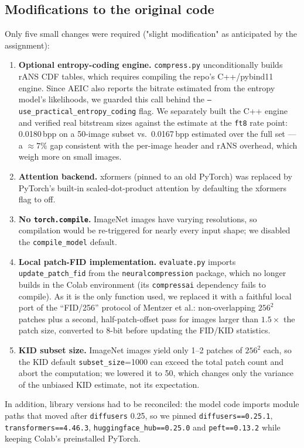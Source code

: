 \documentclass[conference]{IEEEtran}
\begin{document}
\subsection{Modifications to the original code}
Only five small changes were required ("slight modification" as anticipated by the assignment):
\begin{enumerate}
\item \textbf{Optional entropy-coding engine.} \texttt{compress.py} unconditionally builds rANS
CDF tables, which requires compiling the repo's C++/pybind11 engine. Since AEIC also reports the
bitrate estimated from the entropy model's likelihoods, we guarded this call behind the
\texttt{--use\_practical\_entropy\_coding} flag. We separately built the C++ engine and verified
real bitstream sizes against the estimate at the \texttt{ft8} rate point: 0.0180\,bpp on a
50-image subset vs.\ 0.0167\,bpp estimated over the full set --- a ${\approx}7\%$ gap consistent
with the per-image header and rANS overhead, which weigh more on small images.
\item \textbf{Attention backend.} xformers (pinned to an old PyTorch) was replaced by PyTorch's
built-in scaled-dot-product attention by defaulting the xformers flag to off.
\item \textbf{No \texttt{torch.compile}.} ImageNet images have varying resolutions, so
compilation would be re-triggered for nearly every input shape; we disabled the
\texttt{compile\_model} default.
\item \textbf{Local patch-FID implementation.} \texttt{evaluate.py} imports
\texttt{update\_patch\_fid} from the \texttt{neuralcompression} package, which no longer builds
in the Colab environment (its \texttt{compressai} dependency fails to compile). As it is the only
function used, we replaced it with a faithful local port of the ``FID/256'' protocol of Mentzer
et al.: non-overlapping $256^2$ patches plus a second, half-patch-offset pass for images larger
than $1.5\times$ the patch size, converted to 8-bit before updating the FID/KID statistics.
\item \textbf{KID subset size.} ImageNet images yield only 1--2 patches of $256^2$ each, so the
KID default \texttt{subset\_size}=1000 can exceed the total patch count and abort the
computation; we lowered it to 50, which changes only the variance of the unbiased KID estimate,
not its expectation.
\end{enumerate}
In addition, library versions had to be reconciled: the model code imports module paths that
moved after \texttt{diffusers} 0.25, so we pinned \texttt{diffusers==0.25.1},
\texttt{transformers==4.46.3}, \texttt{huggingface\_hub==0.25.0} and \texttt{peft==0.13.2} while
keeping Colab's preinstalled PyTorch.
\end{document}

